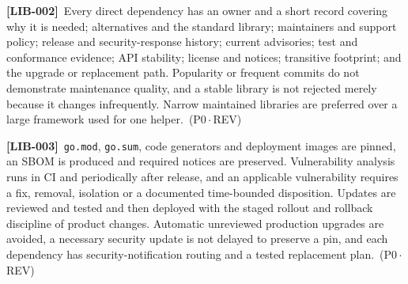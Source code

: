 \documentclass[11pt,a4paper]{article}
\newcommand{\code}[1]{{\small\nolinkurl{#1}}}
\newcommand{\reqtag}[2]{{\footnotesize\color{accent}(#1\,$\cdot$\,#2)}}
\newcommand{\req}[4]{\par\noindent\hypertarget{req:#1}{\textbf{[#1]}}\ #4\ \reqtag{#2}{#3}\par}
\begin{document}
\req{LIB-002}{P0}{REV}{Every direct dependency has an owner and a short record covering why it is needed; alternatives and the standard library; maintainers and support policy; release and security-response history; current advisories; test and conformance evidence; API stability; license and notices; transitive footprint; and the upgrade or replacement path. Popularity or frequent commits do not demonstrate maintenance quality, and a stable library is not rejected merely because it changes infrequently. Narrow maintained libraries are preferred over a large framework used for one helper.}
\req{LIB-003}{P0}{REV}{\code{go.mod}, \code{go.sum}, code generators and deployment images are pinned, an SBOM is produced and required notices are preserved. Vulnerability analysis runs in CI and periodically after release, and an applicable vulnerability requires a fix, removal, isolation or a documented time-bounded disposition. Updates are reviewed and tested and then deployed with the staged rollout and rollback discipline of product changes. Automatic unreviewed production upgrades are avoided, a necessary security update is not delayed to preserve a pin, and each dependency has security-notification routing and a tested replacement plan.}
\end{document}

